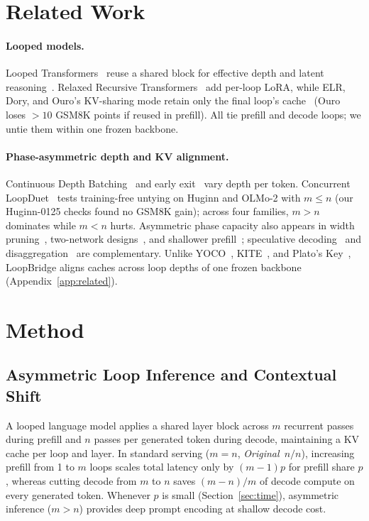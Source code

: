 \documentclass[11pt]{article}
\begin{document}
\section{Related Work}
\label{sec:related}

\paragraph{Looped models.} Looped Transformers~\citep{ut,huginn,ouro,relaxedrecursive,mor} reuse a shared block for
effective depth and latent reasoning~\citep{saunshi2025latent}. Relaxed Recursive Transformers~\citep{relaxedrecursive}
add per-loop LoRA, while ELR, Dory, and Ouro's KV-sharing mode retain only the final loop's cache~\citep{elr,dory,ouro}
(Ouro loses $>10$ GSM8K points if reused in prefill). All tie prefill and decode loops; we untie them within one frozen
backbone.

\paragraph{Phase-asymmetric depth and KV alignment.} Continuous Depth Batching~\citep{cdb} and early
exit~\citep{calm,layerskip} vary depth per token. Concurrent LoopDuet~\citep{loopduet} tests training-free untying on
Huginn and OLMo-2 with $m{\le}n$ (our Huginn-0125 checks found no GSM8K gain); across four families, $m{>}n$ dominates
while $m{<}n$ hurts. Asymmetric phase capacity also appears in width pruning~\citep{overfill}, two-network
designs~\citep{deepshallow,llm2slm,tandem,bridgekv}, and shallower prefill~\citep{swiftkv}; speculative
decoding~\citep{specdecoding,specsampling} and disaggregation~\citep{distserve,splitwise} are complementary. Unlike
YOCO~\citep{yoco}, KITE~\citep{kite}, and Plato's Key~\citep{platoskey}, LoopBridge aligns caches across loop depths of
one frozen backbone (Appendix~\ref{app:related}).

\section{Method}
\label{sec:method}

\subsection{Asymmetric Loop Inference and Contextual Shift}

A looped language model applies a shared layer block across $m$ recurrent passes during prefill and $n$ passes per
generated token during decode, maintaining a KV cache per loop and layer. In standard serving ($m{=}n$, \emph{Original~$n/n$}),
increasing prefill from 1 to $m$ loops scales total latency only by $(m{-}1)p$ for prefill share $p$, whereas cutting
decode from $m$ to $n$ saves $(m{-}n)/m$ of decode compute on every generated token. Whenever $p$ is small
(Section~\ref{sec:time}), asymmetric inference ($m{>}n$) provides deep prompt encoding at shallow decode cost.
\end{document}
